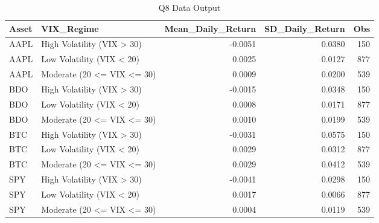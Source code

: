 \begin{table}[H]
\centering
\caption{Q8 Data Output}
\label{tab:q8}
\begin{tabular}{llrrr}
\toprule
Asset & VIX\_Regime & Mean\_Daily\_Return & SD\_Daily\_Return & Obs \\
\midrule
AAPL & High Volatility (VIX > 30) & -0.0051 & 0.0380 & 150 \\
AAPL & Low Volatility (VIX < 20) & 0.0025 & 0.0127 & 877 \\
AAPL & Moderate (20 <= VIX <= 30) & 0.0009 & 0.0200 & 539 \\
BDO & High Volatility (VIX > 30) & -0.0015 & 0.0348 & 150 \\
BDO & Low Volatility (VIX < 20) & 0.0008 & 0.0171 & 877 \\
BDO & Moderate (20 <= VIX <= 30) & 0.0010 & 0.0199 & 539 \\
BTC & High Volatility (VIX > 30) & -0.0031 & 0.0575 & 150 \\
BTC & Low Volatility (VIX < 20) & 0.0029 & 0.0312 & 877 \\
BTC & Moderate (20 <= VIX <= 30) & 0.0029 & 0.0412 & 539 \\
SPY & High Volatility (VIX > 30) & -0.0041 & 0.0298 & 150 \\
SPY & Low Volatility (VIX < 20) & 0.0017 & 0.0066 & 877 \\
SPY & Moderate (20 <= VIX <= 30) & 0.0004 & 0.0119 & 539 \\
\bottomrule
\end{tabular}
\end{table}

